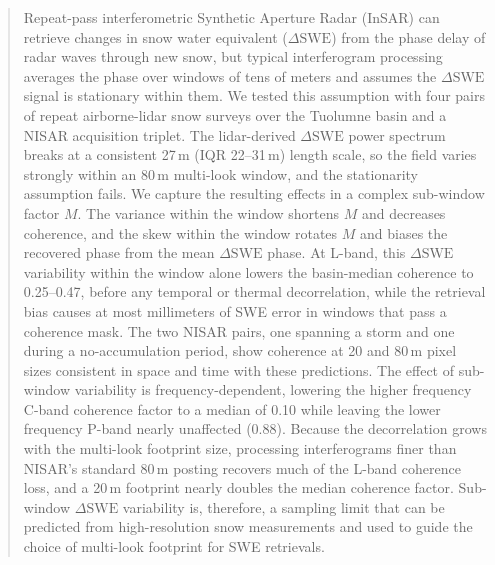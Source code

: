 \documentclass[tc, manuscript]{copernicus}
\begin{document}
\begin{abstract}
Repeat-pass interferometric Synthetic Aperture Radar (InSAR) can retrieve changes in snow water equivalent ($\Delta\mathrm{SWE}$) from the phase delay of radar waves through new snow, but typical interferogram processing averages the phase over windows of tens of meters and assumes the $\Delta\mathrm{SWE}$ signal is stationary within them. We tested this assumption with four pairs of repeat airborne-lidar snow surveys over the Tuolumne basin and a NISAR acquisition triplet. The lidar-derived $\Delta\mathrm{SWE}$ power spectrum breaks at a consistent 27\,\unit{m} (IQR 22--31\,\unit{m}) length scale, so the field varies strongly within an 80\,\unit{m} multi-look window, and the stationarity assumption fails. We capture the resulting effects in a complex sub-window factor $M$. The variance within the window shortens $M$ and decreases coherence, and the skew within the window rotates $M$ and biases the recovered phase from the mean $\Delta\mathrm{SWE}$ phase. At L-band, this $\Delta\mathrm{SWE}$ variability within the window alone lowers the basin-median coherence to 0.25--0.47, before any temporal or thermal decorrelation, while the retrieval bias causes at most millimeters of SWE error in windows that pass a coherence mask. The two NISAR pairs, one spanning a storm and one during a no-accumulation period, show coherence at 20 and 80\,\unit{m} pixel sizes consistent in space and time with these predictions. The effect of sub-window variability is frequency-dependent, lowering the higher frequency C-band coherence factor to a median of 0.10 while leaving the lower frequency P-band nearly unaffected (0.88). Because the decorrelation grows with the multi-look footprint size, processing interferograms finer than NISAR's standard 80\,\unit{m} posting recovers much of the L-band coherence loss, and a 20\,\unit{m} footprint nearly doubles the median coherence factor. Sub-window $\Delta\mathrm{SWE}$ variability is, therefore, a sampling limit that can be predicted from high-resolution snow measurements and used to guide the choice of multi-look footprint for SWE retrievals.
\end{abstract}


\end{document}
